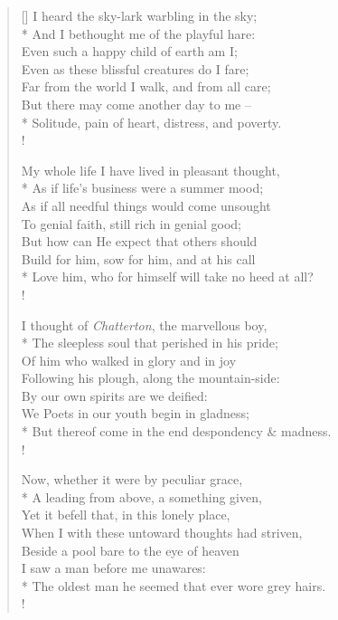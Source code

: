 \documentclass[MAIN]{subfiles}
\begin{document}
\begin{verse}[\versewidth]
I heard the sky-lark warbling in the sky;\\* 
\vin And I bethought me of the playful hare:\\
Even such a happy child of earth am I;\\
\vin Even as these blissful creatures do I fare;\\
\vin Far from the world I walk, and from all care;\\
But there may come another day to me --\\*
Solitude, pain of heart, distress, and poverty.\\!

My whole life I have lived in pleasant thought,\\*
\vin As if life's business were a summer mood;\\
As if all needful things would come unsought\\
\vin To genial faith, still rich in genial good;\\
\vin But how can He expect that others should\\
Build for him, sow for him, and at his call\\* 
Love him, who for himself will take no heed at all?\\!

I thought of \emph{Chatterton}, the marvellous boy,\\* 
\vin The sleepless soul that perished in his pride;\\
Of him who walked in glory and in joy\\ 
\vin Following his plough, along the mountain-side:\\ 
\vin By our own spirits are we deified:\\
We Poets in our youth begin in gladness;\\* 
But thereof come in the end despondency \& madness.\\! 

Now, whether it were by peculiar grace,\\*
\vin A leading from above, a something given,\\
Yet it befell that, in this lonely place,\\
\vin When I with these untoward thoughts had striven,\\ 
\vin Beside a pool bare to the eye of heaven\\
I saw a man before me unawares:\\*
The oldest man he seemed that ever wore grey hairs.\\!


\end{verse}
\end{document}
